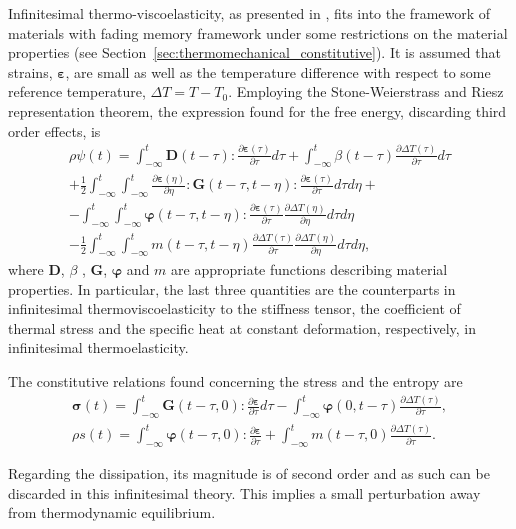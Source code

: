 Infinitesimal thermo-viscoelasticity, as presented in \cite{christensen2013theory}, fits into the framework of materials with fading memory framework under some restrictions on the material properties (see Section~\ref{sec:thermomechanical_constitutive}).
It is assumed that strains, $\bm \varepsilon$, are small as well as the temperature difference with respect to some reference temperature, $\Delta T=T-T_0$.
Employing the Stone-Weierstrass and Riesz representation theorem, the expression found for the free energy, discarding third order effects, is
\begin{multline}
  \rho\psi(t) = \int_{-\infty}^t \mathbf D(t-\tau):\frac{\partial \bm\varepsilon(\tau)}{\partial \tau}d\tau + \int_{-\infty}^t \beta(t-\tau)\frac{\partial \Delta T(\tau)}{\partial \tau}d\tau\\ + \frac{1}{2}\int_{-\infty}^t\int_{-\infty}^t \frac{\partial \bm\varepsilon(\eta)}{\partial \eta}:\mathbf G(t-\tau, t-\eta):\frac{\partial \bm \varepsilon(\tau)}{\partial \tau}d\tau d\eta + \\
  -\int_{-\infty}^t \int_{-\infty}^t \bm\varphi(t-\tau, t-\eta):\frac{\partial \bm\varepsilon(\tau)}{\partial \tau} \frac{\partial \Delta T(\eta)}{\partial \eta} d \tau d \eta\\
  -\frac{1}{2} \int_{-\infty}^t \int_{-\infty}^t m(t-\tau, t-\eta) \frac{\partial \Delta T(\tau)}{\partial \tau} \frac{\partial \Delta T(\eta)}{\partial \eta} d \tau d \eta,
  \end{multline}
where $\mathbf D$, $\beta$ , $\mathbf G$, $\bm \varphi$ and $m$ are appropriate functions describing  material properties.
In particular, the last three quantities are the counterparts in infinitesimal thermoviscoelasticity to the stiffness tensor, the coefficient of thermal stress and the specific heat at constant deformation, respectively, in infinitesimal thermoelasticity.

The constitutive relations found concerning the stress and the entropy are
\begin{gather}
  \bm \sigma(t) = \int_{-\infty}^t \mathbf G(t-\tau, 0):\frac{\partial\bm\varepsilon}{\partial \tau} d\tau-\int_{-\infty}^t \bm\varphi(0, t-\tau)\frac{\partial \Delta T(\tau)}{\partial \tau},\\
  \rho s(t) = \int_{-\infty}^t \bm\varphi(t-\tau, 0):\frac{\partial \bm \varepsilon}{\partial \tau} + \int_{-\infty}^t m(t-\tau, 0)\frac{\partial \Delta T(\tau)}{\partial \tau}.
\end{gather}

Regarding the dissipation, its magnitude is of second order and as such can be discarded in this infinitesimal theory.
This implies a small perturbation away from thermodynamic equilibrium.

